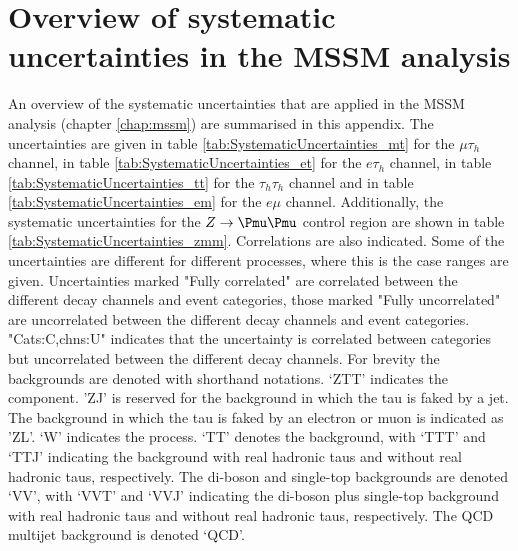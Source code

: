 \appendix
\renewcommand{\chaptername}{Appendix}
\chapter{\texorpdfstring{Overview of systematic uncertainties in the MSSM \AHtotautau analysis}{Overview of systematic uncertainties in the MSSM A/H to tautau analysis}}
\label{appendix:uncerts}
An overview of the systematic uncertainties that are applied in the MSSM \AHtotautau analysis (chapter \ref{chap:mssm})
are summarised in this appendix. The uncertainties are given in
table \ref{tab:SystematicUncertainties_mt} for the $\mu\tau_h$
channel, in table \ref{tab:SystematicUncertainties_et} for the $e\tau_h$ channel,
in table \ref{tab:SystematicUncertainties_tt} for the $\tau_h\tau_h$ channel and
in table \ref{tab:SystematicUncertainties_em} for the $e\mu$ channel. Additionally,
the systematic uncertainties for the $Z\rightarrow\mumu$ control region are shown
in table \ref{tab:SystematicUncertainties_zmm}. Correlations are also indicated.
Some of the uncertainties
are different for different processes, where this is the case ranges are given.
Uncertainties marked "Fully correlated" are correlated between the different
decay channels and event categories, those marked "Fully uncorrelated" are
uncorrelated between the different decay channels and event categories. "Cats:C,chns:U"
indicates that the uncertainty is correlated between categories but uncorrelated between
the different decay channels. For brevity the backgrounds are denoted with shorthand notations.
`ZTT' indicates the \Ztautau component. 'ZJ' is reserved for the \Zellell background
in which the tau is faked by a jet. The \Zellell background in which the tau is faked
by an electron or muon is indicated as 'ZL'. `W' indicates the \Wjets process. `TT' denotes
the \ttbar background, with  `TTT' and `TTJ'
indicating the \ttbar background with real hadronic taus and without real hadronic taus, respectively. 
The di-boson and single-top backgrounds are denoted `VV', with
`VVT' and `VVJ' indicating the di-boson plus single-top background with real hadronic taus
and without real hadronic taus, respectively. The QCD multijet background is denoted `QCD'.




